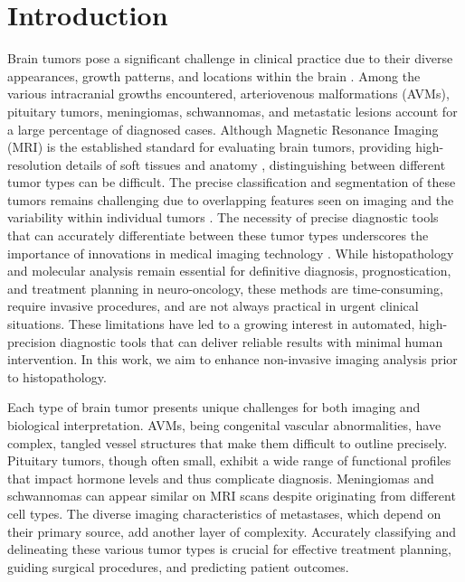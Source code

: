 \documentclass[10pt,twocolumn,letterpaper]{article}
\begin{document}
\section{Introduction}
Brain tumors pose a significant challenge in clinical practice due to their diverse appearances, growth patterns, and locations within the brain \cite{1}. Among the various intracranial growths encountered, arteriovenous malformations (AVMs), pituitary tumors, meningiomas, schwannomas, and metastatic lesions account for a large percentage of diagnosed cases. Although Magnetic Resonance Imaging (MRI) is the established standard for evaluating brain tumors, providing high-resolution details of soft tissues and anatomy \cite{2}, distinguishing between different tumor types can be difficult. The precise classification and segmentation of these tumors remains challenging due to overlapping features seen on imaging and the variability within individual tumors \cite{3,4}. The necessity of precise diagnostic tools that can accurately differentiate between these tumor types underscores the importance of innovations in medical imaging technology \cite{5,6}. While histopathology and molecular analysis remain essential for definitive diagnosis, prognostication, and treatment planning in neuro-oncology, these methods are time-consuming, require invasive procedures, and are not always practical in urgent clinical situations. These limitations have led to a growing interest in automated, high-precision diagnostic tools that can deliver reliable results with minimal human intervention. In this work, we aim to enhance non-invasive imaging analysis prior to histopathology.

Each type of brain tumor presents unique challenges for both imaging and biological interpretation. AVMs, being congenital vascular abnormalities, have complex, tangled vessel structures that make them difficult to outline precisely. Pituitary tumors, though often small, exhibit a wide range of functional profiles that impact hormone levels and thus complicate diagnosis. Meningiomas and schwannomas can appear similar on MRI scans despite originating from different cell types. The diverse imaging characteristics of metastases, which depend on their primary source, add another layer of complexity. Accurately classifying and delineating these various tumor types is crucial for effective treatment planning, guiding surgical procedures, and predicting patient outcomes.
\end{document}
